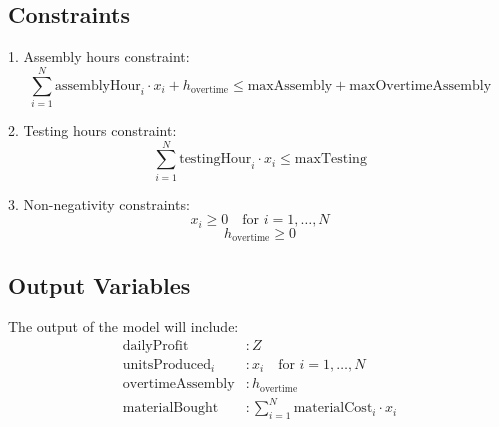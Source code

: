 \documentclass{article}
\begin{document}
\subsection*{Constraints}
1. Assembly hours constraint:
\[
\sum_{i=1}^{N} \text{assemblyHour}_i \cdot x_i + h_{\text{overtime}} \leq \text{maxAssembly} + \text{maxOvertimeAssembly}
\]

2. Testing hours constraint:
\[
\sum_{i=1}^{N} \text{testingHour}_i \cdot x_i \leq \text{maxTesting}
\]

3. Non-negativity constraints:
\[
x_i \geq 0 \quad \text{for } i = 1, \ldots, N
\]
\[
h_{\text{overtime}} \geq 0
\]

\subsection*{Output Variables}
The output of the model will include:
\begin{align*}
\text{dailyProfit} & : Z \\
\text{unitsProduced}_i & : x_i \quad \text{for } i = 1, \ldots, N \\
\text{overtimeAssembly} & : h_{\text{overtime}} \\
\text{materialBought} & : \sum_{i=1}^{N} \text{materialCost}_i \cdot x_i
\end{align*}
\end{document}
